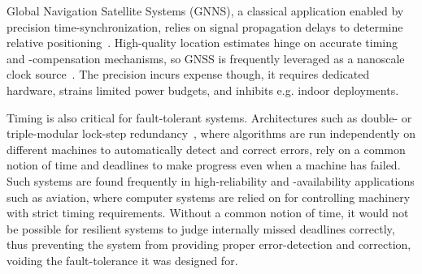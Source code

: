Global Navigation Satellite Systems (GNNS), a classical application enabled by precision time-synchronization, relies on signal propagation delays to determine relative positioning~\cite{intro-to-gnss}.
High-quality location estimates hinge on accurate timing and -compensation mechanisms, so GNSS is frequently leveraged as a nanoscale clock source~\cite{gnss-location-and-time-advances,gnss-for-high-precision-timing}.
The precision incurs expense though, it requires dedicated hardware, strains limited power budgets, and inhibits e.g. indoor deployments.

Timing is also critical for fault-tolerant systems. Architectures such as double- or triple-modular lock-step redundancy~\cite{triple-modular-redundancy,triple-modular-redundancy-evaluation,triple-modular-lock-step-arm}, where algorithms are run independently on different machines to automatically detect and correct errors, rely on a common notion of time and deadlines to make progress even when a machine has failed. Such systems are found frequently in high-reliability and -availability applications such as aviation, where computer systems are relied on for controlling machinery with strict timing requirements.
Without a common notion of time, it would not be possible for resilient systems to judge internally missed deadlines correctly, thus preventing the system from providing proper error-detection and correction, voiding the fault-tolerance it was designed for.

